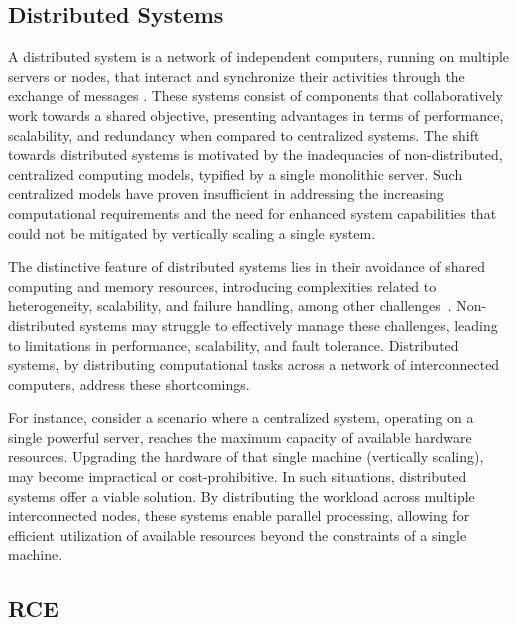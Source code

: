 \subsection{Distributed Systems}
\label{subsec:dissys}
A distributed system is a network of independent computers, running on multiple servers or nodes, that interact and synchronize their activities through the exchange of messages \cite{tanenbaum2007distributed}. These systems consist of components that collaboratively work towards a shared objective, presenting advantages in terms of performance, scalability, and redundancy when compared to centralized systems. The shift towards distributed systems is motivated by the inadequacies of non-distributed, centralized computing models, typified by a single monolithic server. Such centralized models have proven insufficient in addressing the increasing computational requirements and the need for enhanced system capabilities that could not be mitigated by vertically scaling a single system.

The distinctive feature of distributed systems lies in their avoidance of shared computing and memory resources, introducing complexities related to heterogeneity, scalability, and failure handling, among other challenges~\cite{coulouris2005distributed}. Non-distributed systems may struggle to effectively manage these challenges, leading to limitations in performance, scalability, and fault tolerance. Distributed systems, by distributing computational tasks across a network of interconnected computers, address these shortcomings.

For instance, consider a scenario where a centralized system, operating on a single powerful server, reaches the maximum capacity of available hardware resources. Upgrading the hardware of that single machine (vertically scaling), may become impractical or cost-prohibitive. In such situations, distributed systems offer a viable solution. By distributing the workload across multiple interconnected nodes, these systems enable parallel processing, allowing for efficient utilization of available resources beyond the constraints of a single machine. 

\subsection{\acl{RCE}}
\label{subsec:rce}

